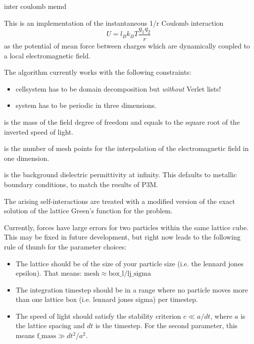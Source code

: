 \begin{essyntax}
  inter coulomb 
  memd   
  \begin{features}
  \end{features}
\end{essyntax}

This is an implementation of the instantaneous 1/r Coulomb interaction
\begin{equation}
  U = l_B k_B T \frac{q_1 q_2}{r}
\end{equation}
as the potential of mean force between charges which are dynamically
coupled to a local electromagnetic field.

The algorithm currently works with the following constraints:

\begin{itemize}
  \item cellsystem has to be domain decomposition but \emph{without}
    Verlet lists!
  \item system has to be periodic in three dimensions.
\end{itemize}

\begin{arguments}
\item[\var{f\_mass}] is the mass of the field degree of freedom and equals
  to the square root of the inverted speed of light.
\item[\var{mesh}] is the number of mesh points for the interpolation
  of the electromagnetic field in one dimension.
\item[\var{\varepsilon_{\infty}}] is the background dielectric
  permittivity at infinity. This defaults to metallic boundary
  conditions, to match the results of P3M.
\end{arguments}

The arising self-interactions are treated with a modified version of
the exact solution of the lattice Green's function for the
problem.

Currently, forces have large errors for two particles within the same
lattice cube. This may be fixed in future development, but right now
leads to the following rule of thumb for the parameter choices:

\begin{itemize}
  \item The lattice should be of the size of your particle size
    (i.e. the lennard jones epsilon). That means: $\text{mesh} \approx
    \text{box\_l} / \text{lj\_sigma}$
  \item The integration timestep should be in a range where no
    particle moves more than one lattice box (i.e. lennard jones
    sigma) per timestep.
  \item The speed of light should satisfy the stability criterion
    $c\ll a/dt$, where $a$ is the lattice spacing and $dt$ is the
    timestep. For the second parameter, this means $\text{f\_mass} \gg
    dt^2/a^2$.
\end{itemize}

